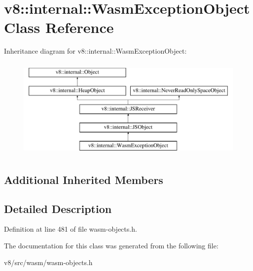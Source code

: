 \hypertarget{classv8_1_1internal_1_1WasmExceptionObject}{}\section{v8\+:\+:internal\+:\+:Wasm\+Exception\+Object Class Reference}
\label{classv8_1_1internal_1_1WasmExceptionObject}
Inheritance diagram for v8\+:\+:internal\+:\+:Wasm\+Exception\+Object\+:\begin{figure}[H]
\begin{center}
\leavevmode
\includegraphics[height=5.000000cm]{classv8_1_1internal_1_1WasmExceptionObject}
\end{center}
\end{figure}
\subsection*{Additional Inherited Members}


\subsection{Detailed Description}


Definition at line 481 of file wasm-\/objects.\+h.



The documentation for this class was generated from the following file\+:\begin{DoxyCompactItemize}
\item 
v8/src/wasm/wasm-\/objects.\+h\end{DoxyCompactItemize}
